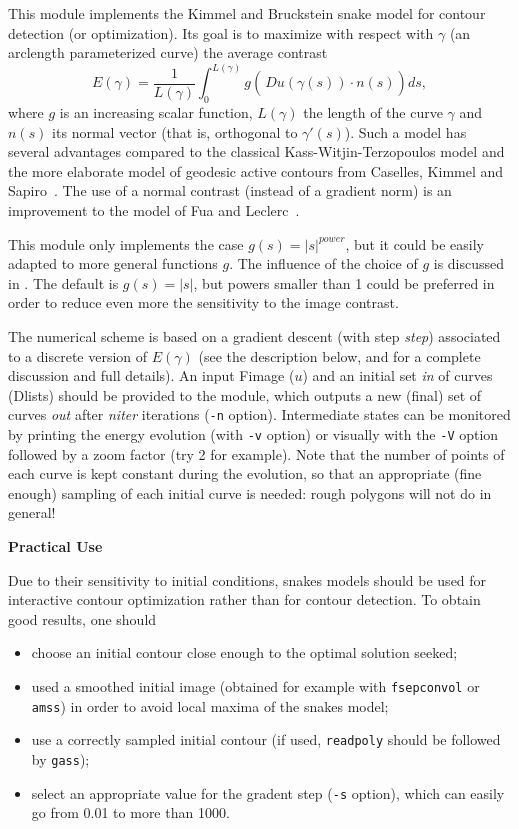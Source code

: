 This module implements the Kimmel and Bruckstein snake model
\cite{kimmel.bruckstein:on} for contour detection 
(or optimization). Its goal is to maximize with respect with 
$\gamma$ (an arclength parameterized curve) the average contrast
$$E(\gamma) =\frac 1 {L(\gamma)}\int_{0}^{L(\gamma)} g\left(\frac{}{}\!\!
Du(\gamma(s))\cdot n(s)\right)ds,$$
where $g$ is an increasing scalar function, $L(\gamma)$ the length of
the curve $\gamma$ and $n(s)$ its normal vector (that is, orthogonal
to $\gamma'(s)$). Such a model has several advantages compared to
the classical Kass-Witjin-Terzopoulos model \cite{kass.witkin.ea:snakes} and
the more elaborate model of geodesic active contours from 
Caselles, Kimmel and Sapiro~\cite{caselles.kimmel.ea:geodesic}. 
The use of a normal contrast (instead
of a gradient norm) is an improvement to the model of Fua
and Leclerc~\cite{fua.leclerc:model}.

This module only implements the case
$g(s)=|s|^{power}$, but it could be easily adapted to more general 
functions $g$. The influence of the
choice of $g$ is discussed in \cite{desolneux.moisan.ea:variational}.
The default is $g(s)=|s|$, but powers smaller than 1 could be preferred
in order to reduce even more the sensitivity to the image contrast.

The numerical scheme is based on a gradient descent (with step {\it step})
associated to a discrete version of $E(\gamma)$ (see the description 
below, and \cite{desolneux.moisan.ea:variational} for a complete discussion and full details).
An input Fimage ($u$) and an initial set {\it in}
of curves (Dlists) should be provided
to the module, which outputs a new (final) set of curves {\it out}
after {\it niter} iterations (\verb+-n+ option). Intermediate
states can be monitored by printing the energy evolution (with
\verb+-v+ option) or visually with the \verb+-V+ option followed by
a zoom factor (try 2 for example). Note that the number of points of
each curve is kept constant during the evolution, 
so that an appropriate (fine enough) sampling 
of each initial curve is needed: rough polygons will not do in general!

\vskip 8mm

\centerline {\bf \large Practical Use}

\vskip 6mm

Due to their sensitivity to initial conditions, snakes models should
be used for interactive contour optimization rather than for contour
detection. To obtain good results, one should

\begin{itemize}
\item choose an initial contour close enough to the optimal solution seeked;
\item used a smoothed initial image (obtained for example with 
\verb+fsepconvol+ or \verb+amss+) in order to avoid local maxima
of the snakes model;
\item use a correctly sampled initial contour (if used, \verb+readpoly+ 
should be followed by \verb+gass+);
\item select an appropriate value for the gradent step (\verb+-s+ option),
which can easily go from 0.01 to more than 1000.
\end{itemize}

